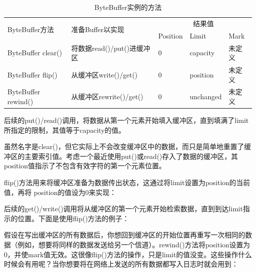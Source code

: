		\begin{table}[htbp]
			\caption{ByteBuffer实例的方法}
			\label{tab:fun.of.byte.buffer}
			\centering
			\begin{tabular}{lllll}
				\hline
					\multirow{2}{*}{ByteBuffer方法} & \multirow{2}{*}{准备Buffer以实现}  & \multicolumn{3}{c}{结果值}   \\
						        					&                                    & Position & Limit     & Mark  \\
				\hline
					ByteBuffer clear()              & 将数据read()/put()进缓冲区         & 0        & capacity  & 未定义 \\
					ByteBuffer flip()               & 从缓冲区write()/get()              & 0        & position  & 未定义 \\
					ByteBuffer rewind()             & 从缓冲区rewrite()/get()            & 0        & unchanged & 未定义 \\
				\hline
			\end{tabular}
		\end{table}

		后续的put()/read()调用，将数据从第一个元素开始填入缓冲区，直到填满了limit所指定的限制，其值等于capacity的值。 

		

		虽然名字是clear()，但它实际上不会改变缓冲区中的数据，而只是简单地重置了缓冲区的主要索引值。考虑一个最近使用put()或read()存入了数据的缓冲区，其position值指示了不包含有效字符的第一个元素位置。 

		

		flip()方法用来将缓冲区准备为数据传出状态，这通过将limit设置为position的当前值，再将 position的值设为0来实现： 

		

		后续的get()/write()调用将从缓冲区的第一个元素开始检索数据，直到到达limit指示的位置。下面是使用flip()方法的例子： 

		

		假设在写出缓冲区的所有数据后，你想回到缓冲区的开始位置再重写一次相同的数据（例如，想要将同样的数据发送给另一个信道）。rewind()方法将position设置为0，并使mark值无效。这很像flip()方法的操作，只是limit的值没变。这些操作什么时候会有用呢？当你想要将在网络上发送的所有数据都写入日志时就会用到： 

